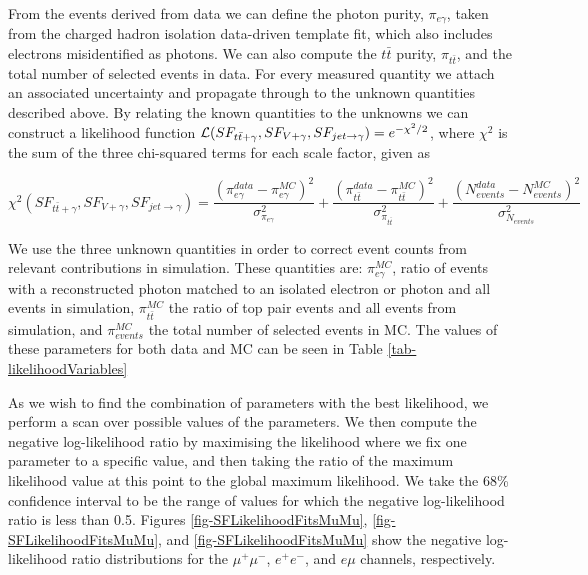 From the events derived from data we can define the photon purity, $\pi_{e\gamma}$, taken from the charged hadron isolation data-driven template fit, which also includes electrons misidentified as photons. We can also compute the $t\bar{t}$ purity, $\pi_{t\bar{t}}$, and the total number of selected events in data. For every measured quantity we attach an associated uncertainty and propagate through to the unknown quantities described above. By relating the known quantities to the unknowns we can construct a likelihood function $\mathcal{L}(SF_{t\bar{t}+\gamma},SF_{V+\gamma},SF_{jet\to\gamma}) = e^{-\chi^2/2}$, where $\chi^2$ is the sum of the three chi-squared terms for each scale factor, given as   

\begin{equation}
\chi^2(SF_{t\bar{t}+\gamma},SF_{V+\gamma},SF_{jet\to\gamma}) = \frac{\left(\pi^{data}_{e\gamma} - \pi^{MC}_{e\gamma}\right)^2}{\sigma^2_{\pi_{e\gamma}}} + \frac{\left(\pi^{data}_{t\bar{t}} - \pi^{MC}_{t\bar{t}}\right)^2}{\sigma^2_{\pi_{t\bar{t}}}} + \frac{\left(N^{data}_{events} - N^{MC}_{events}\right)^2}{\sigma^2_{N_{events}}}
\end{equation}

We use the three unknown quantities in order to correct event counts from relevant contributions in simulation. These quantities are: $\pi_{e\gamma}^{MC}$, ratio of events with a reconstructed photon matched to an isolated electron or photon and all events in simulation, $\pi_{t\bar{t}}^{MC}$ the ratio of top pair events and all events from simulation, and $\pi_{events}^{MC}$ the total number of selected events in MC. The values of these parameters for both data and MC can be seen in Table \ref{tab-likelihoodVariables}	

As we wish to find the combination of parameters with the best likelihood, we perform a scan over possible values of the parameters. We then compute the negative log-likelihood ratio by maximising the likelihood where we fix one parameter to a specific value, and then taking the ratio of the maximum likelihood value at this point to the global maximum likelihood. We take the 68\% confidence interval to be the range of values for which the negative log-likelihood ratio is less than 0.5. Figures \ref{fig-SFLikelihoodFitsMuMu}, \ref{fig-SFLikelihoodFitsMuMu}, and \ref{fig-SFLikelihoodFitsMuMu} show the negative log-likelihood ratio distributions for the $\mu^+\mu^-$, $e^+e^-$, and $e\mu$ channels, respectively. 

